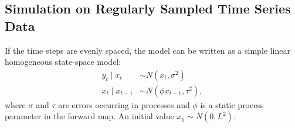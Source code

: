 

\subsection{Simulation on Regularly Sampled Time Series Data}

If the time steps are evenly spaced, the model can be written as a simple linear homogeneous state-space model: 
\begin{equation}
\begin{split}
y_t\mid x_t      &\sim N\left(x_t,\sigma^2\right) \\
x_t\mid x_{t-1} &\sim N\left(\phi x_{t-1},\tau^2\right),
\end{split}
\end{equation}
where $\sigma$ and $\tau$ are \iid  errors occurring in processes and $\phi$ is a static process parameter in the forward map. An initial value $x_1\sim N(0,L^2)$. 

